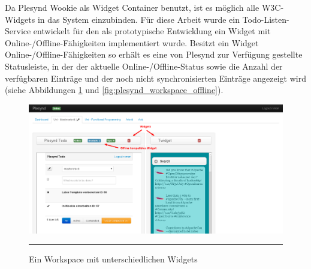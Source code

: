 Da Plesynd Wookie als Widget Container benutzt, ist es möglich alle W3C-Widgets in das System einzubinden. Für diese Arbeit wurde ein Todo-Listen-Service entwickelt für den als prototypische Entwicklung ein Widget mit Online-/Offline-Fähigkeiten implementiert wurde. Besitzt ein Widget Online-/Offline-Fähigkeiten so erhält es eine von Plesynd zur Verfügung gestellte Statusleiste, in der der aktuelle Online-/Offline-Status sowie die Anzahl der verfügbaren Einträge und der noch nicht synchronisierten Einträge angezeigt wird (siehe Abbildungen \ref{fig:plesynd_workspace_online} und \ref{fig:plesynd_workspace_offline}).
\begin{figure}
  \centering
  \includegraphics[width=\textwidth,height=\textheight,keepaspectratio]{./Figures/plesynd_workspace_online.png}
    \rule{35em}{0.5pt}
  \caption[Plesynd User-Interface: Workspace Online]{Ein Workspace mit unterschiedlichen Widgets}
  \label{fig:plesynd_workspace_online}
\end{figure}

